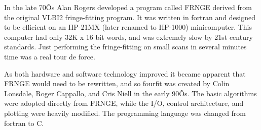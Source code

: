 In the late 70Õs Alan Rogers developed a program called FRNGE derived from the original VLBI2 fringe-fitting program. It was written in fortran and designed to be efficient on an HP-21MX (later renamed to HP-1000) minicomputer. This computer had only 32K x 16 bit words, and was extremely slow by 21st century standards. Just performing the fringe-fitting on small scans in several minutes time was a real tour de force.

As both hardware and software technology improved it became apparent that FRNGE would need to be rewritten, and so fourfit was created by Colin Lonsdale, Roger Cappallo, and Cris Niell in the early 90Õs. The basic algorithms were adopted directly from FRNGE, while the I/O, control architecture, and plotting were heavily modified. The programming language was changed from fortran to C.
